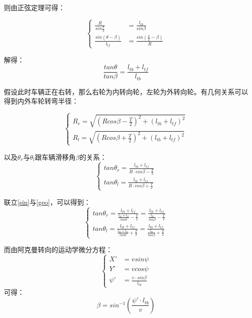 \documentclass[withoutpreface,bwprint]{cumcmthesis} %
\begin{document}
则由正弦定理可得：

\begin{equation}
    \left\{
    \begin{aligned}
        \frac{R}{sin\frac{\pi}{2}} &=\frac{l_{tb}}{sin\beta}\\
        \frac{sin(\theta-\beta)}{l_{tf}} &=\frac{sin(\frac{\pi}{2}-\beta)}{R}
    \end{aligned}
    \right.
\end{equation}

解得：
\begin{equation}
    \label{sin}
    \frac{tan \theta}{tan \beta}=\frac{l_{tb}+l_{tf}}{l_{tb}}
\end{equation}

假设此时车辆正在右转，那么右轮为内转向轮，左轮为外转向轮。有几何关系可以得到内外车轮转弯半径：

\begin{equation}
\left\{
\begin{aligned}
\label{singleR}
R_r=\sqrt{(Rcos\beta-\frac{T}{2})^2+(l_{tb}+l_{tf})^2}\\
R_l=\sqrt{(Rcos\beta+\frac{T}{2})^2+(l_{tb}+l_{tf})^2}
\end{aligned}
\right.
\end{equation}

以及$\theta_r$与$\theta_l$跟车辆滑移角$\beta$的关系：
\begin{equation}
\label{geo}
\left\{
\begin{aligned}
tan\theta_r=\frac{l_{tb}+l_{tf}}{R\cdot cos\beta-\frac{T}{2}} \\
tan\theta_l=\frac{l_{tb}+l_{tf}}{R\cdot cos\beta+\frac{T}{2}}
\end{aligned}
\right.
\end{equation}

联立\eqref{sin}与\eqref{geo}，可以得到：
\begin{equation}
\left\{
\begin{aligned}
tan\theta_r=\frac{l_{tb}+l_{tf}}{\frac{l_{tb}+l_{tf}}{tan \theta}-\frac{T}{2}}=
\frac{l_{tb}+l_{tf}}{\frac{l_{tb}}{tan \beta}-\frac{T}{2}}\\
tan\theta_l=\frac{l_{tb}+l_{tf}}{\frac{l_{tb}+l_{tf}}{tan \theta}+\frac{T}{2}}=
\frac{l_{tb}+l_{tf}}{\frac{l_{tb}}{tan \beta}+\frac{T}{2}}
\end{aligned}
\right.
\end{equation}

而由阿克曼转向的运动学微分方程\supercite{[2]}：
\begin{equation}
\left\{
\begin{aligned}
X'&=v sin \psi\\
Y'&=v cos \psi\\
\psi'&=\frac{v\cdot sin \beta}{l_{tb}}
\end{aligned}
\right.
\end{equation}
可得：
\begin{equation}
    \label{transAngle}
    \beta=sin^{-1}(\frac{\psi' \cdot l_{tb}}{v})
\end{equation}
\end{document}
